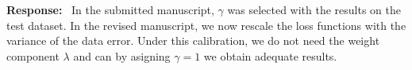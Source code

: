 \documentclass[11pt]{article}
\newenvironment{response}{\par\smallskip\noindent\color{resp}\textbf{Response:}\ }{\par}
\begin{document}
\begin{response}
In the submitted manuscript, $\gamma$ was selected with the results on the test dataset.
In the revised manuscript, we now rescale the loss functions with the variance of the data error. 
Under this calibration, we do not need the weight component $\lambda$ and can by asigning $\gamma= 1$ we obtain adequate results. 


\end{response}
\end{document}
